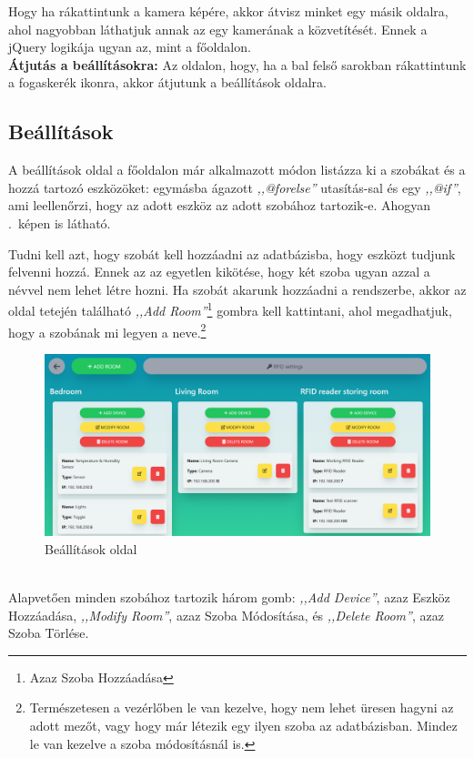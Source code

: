 \documentclass[
]{thesis-ekf}
\theoremstyle{definition}
\theoremstyle{remark}
\begin{document}
	Hogy ha rákattintunk a kamera képére, akkor átvisz minket egy másik oldalra, ahol nagyobban láthatjuk annak az egy kamerának a közvetítését. Ennek a jQuery logikája ugyan az, mint a főoldalon.\\
	\textbf{Átjutás a beállításokra:}
	Az oldalon, hogy, ha a bal felső sarokban rákattintunk a fogaskerék ikonra, akkor átjutunk a beállítások oldalra.
	\subsection{Beállítások}
	A beállítások oldal a főoldalon már alkalmazott módon listázza ki a szobákat és a hozzá tartozó eszközöket: egymásba ágazott \emph{,,@forelse''} utasítás-sal és egy \emph{,,@if''}, ami leellenőrzi, hogy az adott eszköz az adott szobához tartozik-e. Ahogyan .~képen is látható.
	
	Tudni kell azt, hogy szobát kell hozzáadni az adatbázisba, hogy eszközt tudjunk felvenni hozzá. Ennek az az egyetlen kikötése, hogy két szoba ugyan azzal a névvel nem lehet létre hozni. Ha szobát akarunk hozzáadni a rendszerbe, akkor az oldal tetején található \emph{,,Add Room''}\footnote{Azaz Szoba Hozzáadása} gombra kell kattintani, ahol megadhatjuk, hogy a szobának mi legyen a neve.\footnote{Természetesen a vezérlőben le van kezelve, hogy nem lehet üresen hagyni az adott mezőt, vagy hogy már létezik egy ilyen szoba az adatbázisban. Mindez le van kezelve a szoba módosításnál is.}
	\begin{figure}[ht!]
		\centering
		\includegraphics[width=1\textwidth]{./src/pages_img/settings}
		\caption{Beállítások oldal}
		\label{settings}
	\end{figure}\\
	Alapvetően minden szobához tartozik három gomb: \emph{,,Add Device''}, azaz Eszköz Hozzáadása, \emph{,,Modify Room''}, azaz Szoba Módosítása, és \emph{,,Delete Room''}, azaz Szoba Törlése. 
	
\end{document}
